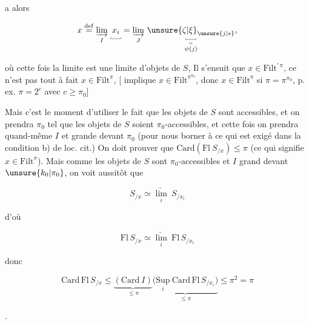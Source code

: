 
a alors

\[
x\overset{\mathrm{def}}{=}\underset{I}{\underrightarrow{\lim}}\ \underset{\rule{.3pt}{2pt}\rule{1.2em}{.3pt}\rule{.3pt}{2pt}}{x_i}
=\underset{J}{\underrightarrow{\lim}}\ \underset{\substack{\rule{.3pt}{2pt}\rule{1.2em}{.3pt}\rule{.3pt}{2pt}\\\shortparallel\\\psi(j)}}{\unsure{\zeta|\xi}_{\unsure{j|s}}},
\]


où cette fois la limite est une limite d'objets de $S$,  Il s'ensuit que $x\in\mathrm{Filt}^{\prime\,\pi}$, ce n'est pas tout à fait $x\in\mathrm{Filt}^{\pi}$,  [ implique $x\in\mathrm{Filt}^{\pi^{\pi_0}}$,  donc $x\in\mathrm{Filt}^{\pi}$ si $\pi=\pi^{\pi_0}$, p. ex. $\pi=2^c$ avec $c\geq\pi_0$]

Mais c'est le moment d'utiliser le fait que les objets de $S$ sont accessibles, et on prendra $\pi_0$ tel que les objets de $S$ soient $\pi_0$-accessibles, et cette fois on prendra quand-même $I$  et grande devant $\pi_0$ (pour nous borner à ce qui est exigé dans la condition b) de loc. cit.) On doit prouver que $\mathrm{Card}(\mathrm{Fl}\ S_{/x})\leq\pi$ (ce qui signifie $x\in\mathrm{Filt}^{\pi}$). Mais comme les objets de $S$ sont $\pi_0$-accessibles et $I$ grand devant $\unsure{k_0|\pi_0}$, on voit aussitôt que

\[
S_{/x}\simeq\underset{i}{\underrightarrow{\lim}}\ S_{/x_i}
\]

d'où

\[
\mathrm{Fl}\,S_{/x}\simeq\underset{i}{\underrightarrow{\lim}}\ \mathrm{Fl}\,S_{/x_i}
\]

donc

\[
\mathrm{Card}\,\mathrm{Fl}\,S_{/x}\leq
\underbrace{(\mathrm{Card}\ I)}_{\leq\pi}
\underbrace{\bigl(\underset{i}{\mathrm{Sup}}\ \mathrm{Card}\,\mathrm{Fl}\,S_{/x_i}\bigr)}_{\leq\pi}
\leq\pi^2=\pi
\]

.

